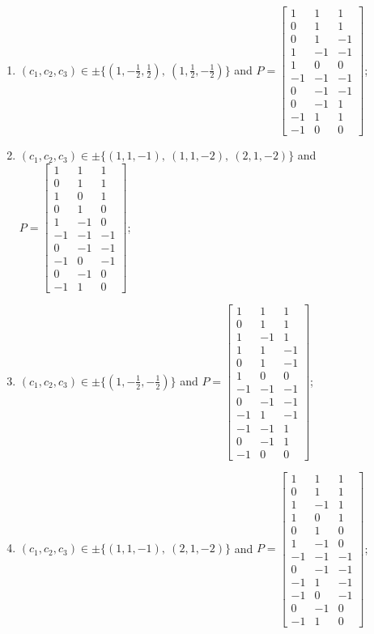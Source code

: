 \begin{enumerate}
\item[(d40)\,\newitem] $(c_1,c_2,c_3)\in \pm\{(1,-\tfrac{1}{2},\tfrac{1}{2}),\allowbreak\ (1,\tfrac{1}{2},-\tfrac{1}{2})\}$ and $P=\begin{bmatrix}1&1&1\\0&1&1\\0&1&-1\\1&-1&-1\\1&0&0\\-1&-1&-1\\0&-1&-1\\0&-1&1\\-1&1&1\\-1&0&0\end{bmatrix}$;
\item[(d41)\,\newitem] $(c_1,c_2,c_3)\in \pm\{(1,1,-1),\allowbreak\ (1,1,-2),\allowbreak\ (2,1,-2)\}$ and $P=\begin{bmatrix}1&1&1\\0&1&1\\1&0&1\\0&1&0\\1&-1&0\\-1&-1&-1\\0&-1&-1\\-1&0&-1\\0&-1&0\\-1&1&0\end{bmatrix}$;
\item[(d42)\,\newitem] $(c_1,c_2,c_3)\in \pm\{(1,-\tfrac{1}{2},-\tfrac{1}{2})\}$ and $P=\begin{bmatrix}1&1&1\\0&1&1\\1&-1&1\\1&1&-1\\0&1&-1\\1&0&0\\-1&-1&-1\\0&-1&-1\\-1&1&-1\\-1&-1&1\\0&-1&1\\-1&0&0\end{bmatrix}$;
\item[(d43)\,\newitem] $(c_1,c_2,c_3)\in \pm\{(1,1,-1),\allowbreak\ (2,1,-2)\}$ and $P=\begin{bmatrix}1&1&1\\0&1&1\\1&-1&1\\1&0&1\\0&1&0\\1&-1&0\\-1&-1&-1\\0&-1&-1\\-1&1&-1\\-1&0&-1\\0&-1&0\\-1&1&0\end{bmatrix}$;

\end{enumerate}
